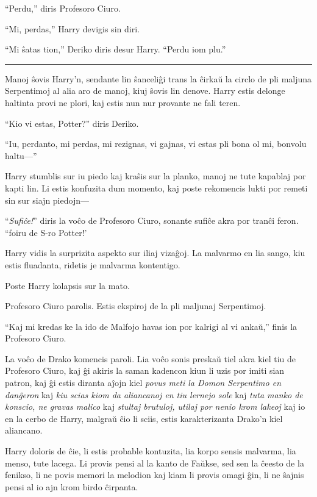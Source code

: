 ``Perdu,'' diris Profesoro Ciuro.

``Mi, perdas,'' Harry devigis sin diri.

``Mi ŝatas tion,'' Deriko diris desur Harry. ``Perdu iom plu.''

\begin{center}\rule{3in}{0.4pt}\end{center}

Manoj ŝovis Harry'n, sendante lin ŝanceliĝi trans la ĉirkaŭ la circlo
de pli maljuna Serpentimoj al alia aro de manoj, kiuj ŝovis lin
denove. Harry estis delonge haltinta provi ne plori, kaj estis nun nur
provante ne fali teren.

``Kio vi estas, Potter?'' diris Deriko.

``Iu, perdanto, mi perdas, mi rezignas, vi gajnas, vi estas pli bona
ol mi, bonvolu haltu—''

Harry stumblis sur iu piedo kaj kraŝis sur la planko, manoj ne tute
kapablaj por kapti lin. Li estis konfuzita dum momento, kaj poste
rekomencis lukti por remeti sin sur siajn piedojn—

``\emph{Sufiĉe!}'' diris la voĉo de Profesoro Ciuro, sonante sufiĉe
akra por tranĉi feron. ``foiru de S-ro Potter!'

Harry vidis la surprizita aspekto sur iliaj vizaĝoj. La malvarmo en
lia sango, kiu estis fluadanta, ridetis je malvarma kontentigo.

Poste Harry kolapsis sur la mato.

Profesoro Ciuro parolis. Estis ekspiroj de la pli maljunaj Serpentimoj.

``Kaj mi kredas ke la ido de Malfojo havas ion por kalrigi al vi
ankaŭ,'' finis la Profesoro Ciuro.

La voĉo de Drako komencis paroli. Lia voĉo sonis preskaŭ tiel akra
kiel tiu de Profesoro Ciuro, kaj ĝi akiris la saman kadencon kiun li uzis
por imiti sian patron, kaj ĝi estis diranta aĵojn kiel \emph{povus
meti la Domon Serpentimo en danĝeron} kaj \emph{kiu scias kiom da
aliancanoj en tiu lernejo sole} kaj \emph{tuta manko de konscio, ne
gravas malico} kaj \emph{stultaj brutuloj, utilaj por nenio krom
lakeoj} kaj io en la cerbo de Harry, malgraŭ ĉio li sciis, estis
karakterizanta Drako'n kiel aliancano.

Harry doloris de ĉie, li estis probable kontuzita, lia korpo sensis
malvarma, lia menso, tute lacega. Li provis pensi al la kanto de
Faŭkse, sed sen la ĉeesto de la fenikso, li ne povis memori la
melodion kaj kiam li provis omagi ĝin, li ne ŝajnis pensi al io ajn
krom birdo ĉirpanta.

